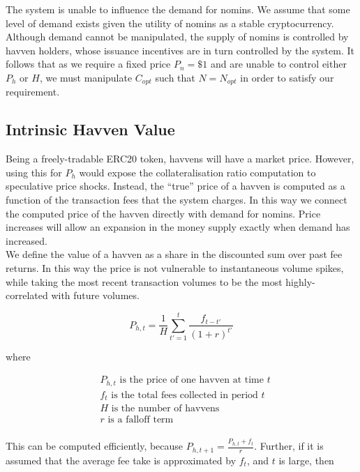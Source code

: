 \noindent The system is unable to influence the demand for nomins. We assume that some level of demand exists given the utility of nomins as a stable cryptocurrency. Although demand cannot be manipulated, the supply of nomins is controlled by havven holders, whose issuance incentives are in turn controlled by the system. It follows that as we require a fixed price $P_n = \$1 $ and are unable to control either $P_h$ or $H$, we must manipulate $C_{opt}$ such that $N = N_{opt}$ in order to satisfy our requirement.

\subsection{Intrinsic Havven Value}

\noindent Being a freely-tradable ERC20 token, havvens will have a market price.
However, using this for $P_h$ would expose the collateralisation ratio computation
to speculative price shocks. Instead, the ``true'' price of a havven is computed as a
function of the transaction fees that the system charges. In this way we connect the
computed price of the havven directly with demand for nomins.
Price increases will allow an expansion in the money supply exactly when demand has increased. \\

\noindent We define the value of a havven as a share in the discounted sum over past fee returns.
In this way the price is not vulnerable to instantaneous volume spikes, while
taking the most recent transaction volumes to be the most highly-correlated with future volumes.

\begin{equation}
    P_{h,t} = \frac{1}{H} \sum_{t'=1}^{t} \frac{f_{t - t'}}{(1 + r)^{t'}}
\end{equation}

where

\begin{align*} 
& P_{h,t} \text{ is the price of one havven at time } t  \\
& f_t \text{ is the total fees collected in period } t\\
& H \text{ is the number of havvens}  \\
& r \text{ is a falloff term}  \\
\end{align*}

\noindent This can be computed efficiently, because $P_{h,t+1} = \frac{P_{h,t} + f_t}{r}$. 
Further, if it is assumed that the average fee take is approximated by $f_t$, and $t$ is large, then

